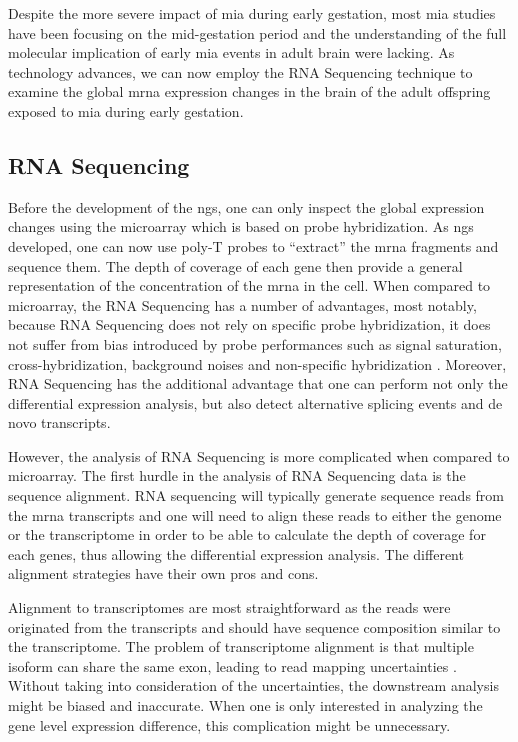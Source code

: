 	Despite the more severe impact of \gls{mia} during early gestation, most \gls{mia} studies have been focusing on the mid-gestation period and the understanding of the full molecular implication of early \gls{mia} events in adult brain were lacking.
	As technology advances, we can now employ the RNA Sequencing technique to examine the global \gls{mrna} expression changes in the brain of the adult offspring exposed to \gls{mia} during early gestation.
	
	\subsection{RNA Sequencing}
	Before the development of the \gls{ngs}, one can only inspect the global expression changes using the microarray which is based on probe hybridization.
	As \gls{ngs} developed, one can now use poly-T probes to ``extract'' the \gls{mrna} fragments and sequence them.
	The depth of coverage of each gene then provide a general representation of the concentration of the \gls{mrna} in the cell.
	When compared to microarray, the RNA Sequencing has a number of advantages, most notably, because RNA Sequencing does not rely on specific probe hybridization, it does not suffer from bias introduced by probe performances such as signal saturation, cross-hybridization, background noises and non-specific hybridization \citep{Zhao2014}.
	Moreover, RNA Sequencing has the additional advantage that one can perform not only the differential expression analysis, but also detect alternative splicing events and de novo transcripts.
	
	However, the analysis of RNA Sequencing is more complicated when compared to microarray.
	The first hurdle in the analysis of RNA Sequencing data is the sequence alignment.
	RNA sequencing will typically generate sequence reads from the \gls{mrna} transcripts and one will need to align these reads to either the genome or the transcriptome in order to be able to calculate the depth of coverage for each genes, thus allowing the differential expression analysis.
	The different alignment strategies have their own pros and cons.
	
	Alignment to transcriptomes are most straightforward as the reads were originated from the transcripts and should have sequence composition similar to the transcriptome. 
	The problem of transcriptome alignment is that multiple isoform can share the same exon, leading to read mapping uncertainties \citep{Li2011e}.
	Without taking into consideration of the uncertainties, the downstream analysis might be biased and inaccurate. 
	When one is only interested in analyzing the gene level expression difference, this complication might be unnecessary.
	
